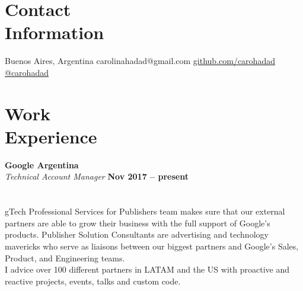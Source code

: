 \documentclass[margin,line]{resume}
\begin{document}
\begin{resume}

\section{\mysidestyle Contact\\Information}

\faMapMarker \vspace{5mm} Buenos Aires, Argentina \hfill
\faEnvelope \vspace{5mm} carolinahadad@gmail.com
\faGithub \vspace{5mm} \href{https://github.com/carohadad}{github.com/carohadad} \hfill
\faTwitter \vspace{5mm} \href{https://twitter.com/carohadad}{@carohadad}

\vspace{-1.5cm}
\section{\mysidestyle Work\\Experience}


\textbf{Google Argentina}\vspace{2mm}\\\vspace{1mm}
\textsl{Technical Account Manager} 
 \hfill \textbf{Nov 2017 -- present}\vspace{-3mm}\\\vspace{-1mm}
\hfill \vspace{-3mm}\\\vspace{-1mm}
\\
gTech Professional Services for Publishers team makes sure that our external partners are able to grow their business with the full support of Google's products. Publisher Solution Consultants are advertising and technology mavericks who serve as liaisons between our biggest partners and Google's Sales, Product, and Engineering teams. 
\\
I advice over 100 different partners in LATAM and the US with proactive and reactive projects, events, talks and custom code.
 



\end{resume}
\end{document}
